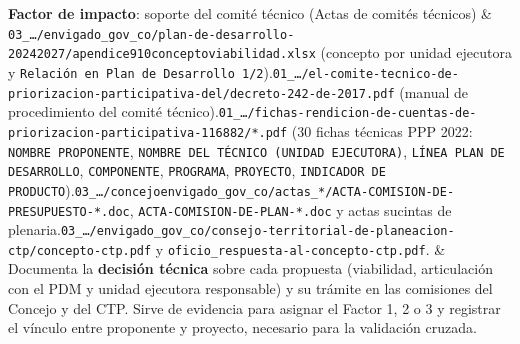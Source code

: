 \documentclass[11pt,a4paper]{article}
\begin{document}
{\begin{longtable}
\textbf{Factor de impacto}: soporte del comité técnico (Actas de comités técnicos) & \texttt{03\_\allowbreak{}\ldots{}/\allowbreak{}envigado\_\allowbreak{}gov\_\allowbreak{}co/\allowbreak{}plan-\allowbreak{}de-\allowbreak{}desarrollo-\allowbreak{}20242027/\allowbreak{}apendice910conceptoviabilidad.\allowbreak{}xlsx} (concepto por unidad ejecutora y \texttt{Relación en Plan de Desarrollo 1/\allowbreak{}2}).\newline \texttt{01\_\allowbreak{}\ldots{}/\allowbreak{}el-\allowbreak{}comite-\allowbreak{}tecnico-\allowbreak{}de-\allowbreak{}priorizacion-\allowbreak{}participativa-\allowbreak{}del/\allowbreak{}decreto-\allowbreak{}242-\allowbreak{}de-\allowbreak{}2017.\allowbreak{}pdf} (manual de procedimiento del comité técnico).\newline \texttt{01\_\allowbreak{}\ldots{}/\allowbreak{}fichas-\allowbreak{}rendicion-\allowbreak{}de-\allowbreak{}cuentas-\allowbreak{}de-\allowbreak{}priorizacion-\allowbreak{}participativa-\allowbreak{}116882/\allowbreak{}*.\allowbreak{}pdf} (30 fichas técnicas PPP 2022: \texttt{NOMBRE PROPONENTE}, \texttt{NOMBRE DEL TÉCNICO (UNIDAD EJECUTORA)}, \texttt{LÍNEA PLAN DE DESARROLLO}, \texttt{COMPONENTE}, \texttt{PROGRAMA}, \texttt{PROYECTO}, \texttt{INDICADOR DE PRODUCTO}).\newline \texttt{03\_\allowbreak{}\ldots{}/\allowbreak{}concejoenvigado\_\allowbreak{}gov\_\allowbreak{}co/\allowbreak{}actas\_\allowbreak{}*/\allowbreak{}ACTA-\allowbreak{}COMISION-\allowbreak{}DE-\allowbreak{}PRESUPUESTO-\allowbreak{}*.\allowbreak{}doc}, \texttt{ACTA-\allowbreak{}COMISION-\allowbreak{}DE-\allowbreak{}PLAN-\allowbreak{}*.\allowbreak{}doc} y actas sucintas de plenaria.\newline \texttt{03\_\allowbreak{}\ldots{}/\allowbreak{}envigado\_\allowbreak{}gov\_\allowbreak{}co/\allowbreak{}consejo-\allowbreak{}territorial-\allowbreak{}de-\allowbreak{}planeacion-\allowbreak{}ctp/\allowbreak{}concepto-\allowbreak{}ctp.\allowbreak{}pdf} y \texttt{oficio\_\allowbreak{}respuesta-\allowbreak{}al-\allowbreak{}concepto-\allowbreak{}ctp.\allowbreak{}pdf}. & Documenta la \textbf{decisión técnica} sobre cada propuesta (viabilidad, articulación con el PDM y unidad ejecutora responsable) y su trámite en las comisiones del Concejo y del CTP. Sirve de evidencia para asignar el Factor 1, 2 o 3 y registrar el vínculo entre proponente y proyecto, necesario para la validación cruzada. \\

\end{longtable}}
\end{document}
